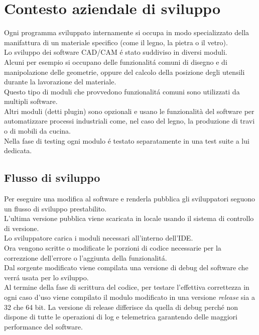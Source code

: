 \chapter{Contesto aziendale di sviluppo}
    Ogni programma sviluppato internamente si occupa in modo specializzato della manifattura di un materiale specifico (come il legno, la pietra o il vetro).\\
    Lo sviluppo dei software CAD/CAM \'e stato suddiviso in diversi moduli.\\
    Alcuni per esempio si occupano delle funzionalit\'a comuni di disegno e di manipolazione delle geometrie, oppure del calcolo della posizione degli utensili durante la lavorazione del materiale.\\
    Questo tipo di moduli che provvedono funzionalit\'a comuni sono utilizzati da multipli software.\\
    Altri moduli (detti plugin) sono opzionali e usano le funzionalità del software per automatizzare processi industriali come, nel caso del legno, la produzione di travi o di mobili da cucina.\\
    
    Nella fase di testing ogni modulo \'e testato separatamente in una test suite a lui dedicata.\\

    \section{Flusso di sviluppo}
        Per eseguire una modifica al software e renderla pubblica gli sviluppatori seguono un flusso di sviluppo prestabilito.\\
        L'ultima versione pubblica viene scaricata in locale usando il sistema di controllo di versione.\\
        Lo sviluppatore carica i moduli necessari all'interno dell'IDE.\\
        Ora vengono scritte o modificate le porzioni di codice necessarie per la correzzione dell'errore o l'aggiunta della funzionalit\'a.\\
        Dal sorgente modificato viene compilata una versione di debug del software che verr\'a usata per lo sviluppo.\\
        Al termine della fase di scrittura del codice, per testare l'effettiva correttezza in ogni caso d'uso viene compilato il modulo modificato in una versione \textit{release} sia a 32 che 64 bit.
        La versione di release differisce da quella di debug perch\'e non dispone di tutte le operazioni di log e telemetrica garantendo delle maggiori performance del software.\\
        
